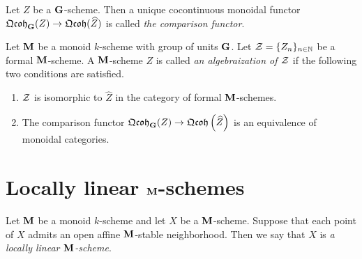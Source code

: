 \begin{definition}
Let $Z$ be a $\mathbf{G}$-scheme. Then a unique cocontinuous monoidal functor $\mathfrak{Qcoh}_{\mathbf{G}}(Z)\rightarrow \mathfrak{Qcoh}(\widehat{Z})$ is called \textit{the comparison functor}.
\end{definition}

\begin{definition}
Let $\mathbf{M}$ be a monoid $k$-scheme with group of units $\mathbf{G}$. Let ${\mathcal Z} = \{Z_n\}_{n\in \mathbb{N}}$ be a formal $\mathbf{M}$-scheme. A $\mathbf{M}$-scheme $Z$ is called \textit{an algebraization of ${\mathcal Z}$} if the following two conditions are satisfied.
\begin{enumerate}[label=\textbf{(\arabic*)}, leftmargin=3.0em]
\item ${\mathcal Z}$ is isomorphic to $\widehat{Z}$ in the category of formal $\mathbf{M}$-schemes.
\item The comparison functor $\mathfrak{Qcoh}_{\mathbf{G}}(Z)\rightarrow \mathfrak{Qcoh}\left(\widehat{Z}\right)$ is an equivalence of monoidal categories.
\end{enumerate}
\end{definition}

\section{Locally linear $\mathbf{M}$-schemes}

\begin{definition}
Let $\mathbf{M}$ be a monoid $k$-scheme and let $X$ be a $\mathbf{M}$-scheme. Suppose that each point of $X$ admits an open affine $\mathbf{M}$-stable neighborhood. Then we say that $X$ is \textit{a locally linear $\mathbf{M}$-scheme}.
\end{definition}

